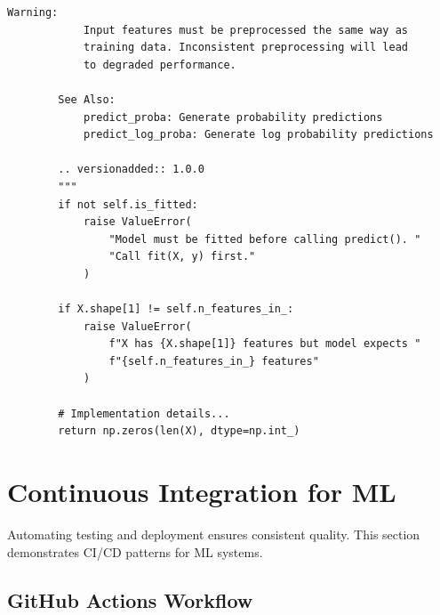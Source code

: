 \begin{lstlisting}[style=python, caption=Comprehensive docstring examples]
        Warning:
            Input features must be preprocessed the same way as
            training data. Inconsistent preprocessing will lead
            to degraded performance.

        See Also:
            predict_proba: Generate probability predictions
            predict_log_proba: Generate log probability predictions

        .. versionadded:: 1.0.0
        """
        if not self.is_fitted:
            raise ValueError(
                "Model must be fitted before calling predict(). "
                "Call fit(X, y) first."
            )

        if X.shape[1] != self.n_features_in_:
            raise ValueError(
                f"X has {X.shape[1]} features but model expects "
                f"{self.n_features_in_} features"
            )

        # Implementation details...
        return np.zeros(len(X), dtype=np.int_)
\end{lstlisting}

\section{Continuous Integration for ML}

Automating testing and deployment ensures consistent quality. This section demonstrates CI/CD patterns for ML systems.

\subsection{GitHub Actions Workflow}

